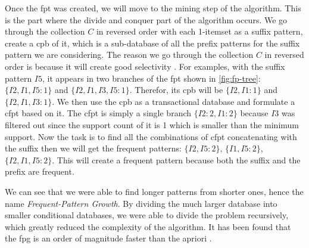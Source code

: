 Once the \acl{fpt} was created, we will move to the mining step of the algorithm.
This is the part where the divide and conquer part of the algorithm occurs.
We go through the collection $C$ in reversed order with each 1-itemset as a suffix pattern, create a \acl{cpb} of it, which is a sub-database of all the prefix patterns for the suffix pattern we are considering.
The reason we go through the collection $C$ in reversed order is because it will create good selectivity \citep{han2012mining}.
For examples, with the suffix pattern $I5$, it appears in two branches of the \acl{fpt} shown in \autoref{fig:fp-tree}: $\{I2, I1, I5: 1\}$ and $\{I2, I1, I3, I5: 1\}$.
Therefor, its \acl{cpb} will be $\{I2, I1: 1\}$ and $\{I2, I1, I3: 1\}$.
We then use the \acl{cpb} as a transactional database and formulate a \acl{cfpt} based on it.
The \acl{cfpt} is simply a single branch $\{I2:2, I1:2\}$ because $I3$ was filtered out since the support count of it is 1 which is smaller than the minimum support.
Now the task is to find all the combinations of \acl{cfpt} concatenating with the suffix then we will get the frequent patterns: $\{I2, I5: 2\}$, $\{I1, I5: 2\}$, $\{I2, I1, I5: 2\}$.
This will create a frequent pattern because both the suffix and the prefix are frequent.

We can see that we were able to find longer patterns from shorter ones, hence the name \textit{Frequent-Pattern Growth}.
By dividing the much larger database into smaller conditional databases, we were able to divide the problem recursively, which greatly reduced the complexity of the algorithm.
It has been found that the \acl{fpg} is an order of magnitude faster than the \acl{apriori} \citep{han2012mining}.